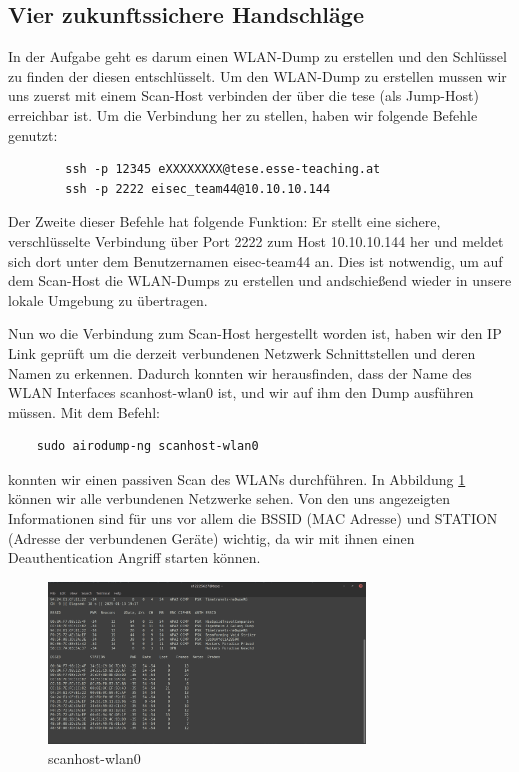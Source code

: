 \documentclass[12pt, a4paper, titlepage, oneside]{scrartcl}
\begin{document}
	\subsection{Vier zukunftssichere Handschl\"age}
	In der Aufgabe geht es darum einen WLAN-Dump zu erstellen und den Schlüssel zu finden der diesen entschlüsselt.
	Um den WLAN-Dump zu erstellen mussen wir uns zuerst mit einem Scan-Host verbinden der über die tese (als Jump-Host) erreichbar ist. Um die Verbindung her zu stellen, haben wir folgende Befehle genutzt:

	\begin{lstlisting}
		ssh -p 12345 eXXXXXXXX@tese.esse-teaching.at
		ssh -p 2222 eisec_team44@10.10.10.144
	\end{lstlisting}

	Der Zweite dieser Befehle hat folgende Funktion:
	Er stellt eine sichere, verschlüsselte Verbindung über Port 2222 zum Host 10.10.10.144 her und meldet sich dort unter dem Benutzernamen eisec-team44 an. Dies ist notwendig, um auf dem Scan-Host die WLAN-Dumps zu erstellen und andschießend wieder in unsere lokale Umgebung zu übertragen.


	Nun wo die Verbindung zum Scan-Host hergestellt worden ist, haben wir den IP Link geprüft um die derzeit verbundenen Netzwerk Schnittstellen und deren Namen zu erkennen. Dadurch konnten wir herausfinden, dass der Name des WLAN Interfaces scanhost-wlan0 ist, und wir auf ihm den Dump ausführen müssen. Mit dem Befehl:
	
	\begin{lstlisting}
	sudo airodump-ng scanhost-wlan0 
	\end{lstlisting}

	konnten wir einen passiven Scan des WLANs durchführen. In Abbildung \ref{fig:scanhost-wlan0} können wir alle verbundenen Netzwerke sehen. Von den uns angezeigten Informationen sind für uns vor allem die BSSID (MAC Adresse) und STATION (Adresse der verbundenen Geräte) wichtig, da wir mit ihnen einen Deauthentication Angriff starten können.

	\begin{figure}[h]
		\centering
		\includegraphics[width=0.75\textwidth]{imgs/Wireless Time Travel/scanhost-wlan0.png}
		\caption{scanhost-wlan0}
		\label{fig:scanhost-wlan0}
	\end{figure}
\end{document}
